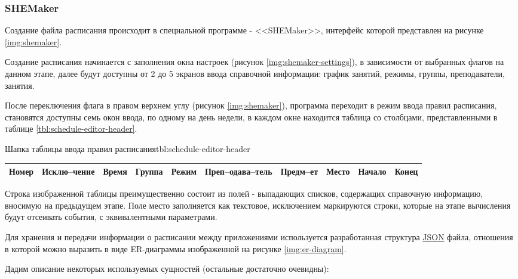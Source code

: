\subsubsection{SHEMaker}

Создание файла расписания происходит в специальной программе - <<SHEMaker>>, интерфейс которой представлен на рисунке \ref{img:shemaker}.


Создание расписания начинается с заполнения окна настроек (рисунок \ref{img:shemaker-settings}), в зависимости от выбранных флагов на данном этапе, далее будут доступны от 2 до 5 экранов ввода справочной информации: график занятий, режимы, группы, преподаватели, занятия.


После переключения флага в правом верхнем углу (рисунок \ref{img:shemaker}), программа переходит в режим ввода правил расписания, становятся доступны семь окон ввода, по одному на день недели, в каждом окне находится таблица со столбцами, представленными в таблице \ref{tbl:schedule-editor-header}.

\begin{tblh}{Шапка таблицы ввода правил расписания}{tbl:schedule-editor-header}
  \begin{tabularx}{\textwidth}{| *{10}{X |}}
    \hline Номер
    & Исклю--чение
    & Время
    & Группа
    & Режим
    & Преп--одава--тель
    & Предм--ет
    & Место
    & Начало
    & Конец \\
    \hline
  \end{tabularx}
\end{tblh}

Строка изображенной таблицы преимущественно состоит из полей - выпадающих списков, содержащих справочную информацию, вносимую на предыдущем этапе.
Поле место заполняется как текстовое, исключением маркируются строки, которые на этапе вычисления будут отсеивать события, с эквивалентными параметрами.

Для хранения и передачи информации о расписании между приложениями используется разработанная структура \hyperlink{json}{JSON} файла, отношения в которой можно выразить в виде ER-диаграммы изображенной на рисунке \ref{img:er-diagram}.


Дадим описание некоторых используемых сущностей (остальные достаточно очевидны):

